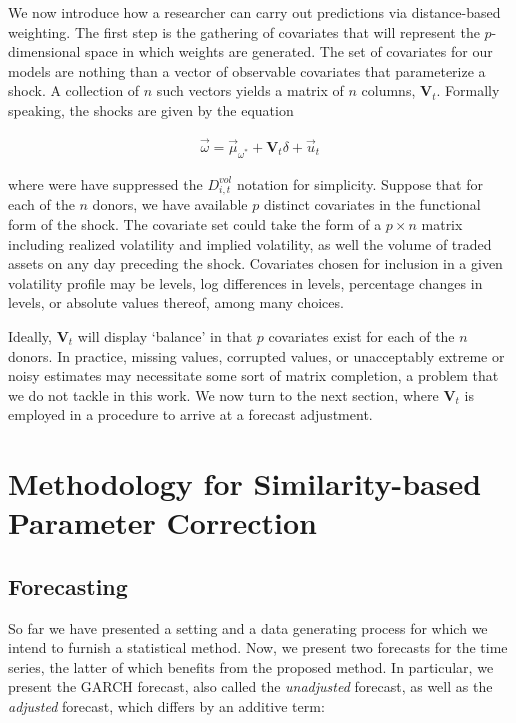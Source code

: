 \documentclass[11pt,3p,review,authoryear]{elsarticle}
\theoremstyle{definition}
\begin{document}
    We now introduce how a researcher can carry out predictions via distance-based weighting.  The first step is the gathering of covariates that will represent the $p$-dimensional space in which weights are generated.  The set of covariates for our models are nothing than a vector of observable covariates that parameterize a shock.  A collection of $n$ such vectors yields a matrix of $n$ columns, $\textbf{V}_{t}$.  Formally speaking, the shocks are given by the equation

    \begin{align*}
     \vec{\omega} = \vec{\mu}_{\omega^{*}} + \textbf{V}_{t}\delta + \vec{u}_{t}  
    \end{align*}
    
    where were have suppressed the $D^{vol}_{i,t}$ notation for simplicity.  Suppose that for each of the $n$ donors, we have available $p$ distinct covariates in the functional form of the shock.  The covariate set could take the form of a $p \times n$ matrix including realized volatility and implied volatility, as well the volume of traded assets on any day preceding the shock.  Covariates chosen for inclusion in a given volatility profile may be levels, log differences in levels, percentage changes in levels, or absolute values thereof, among many choices.

      Ideally, $\textbf{V}_{t}$ will display `balance' in that $p$ covariates exist for each of the $n$ donors.  In practice, missing values, corrupted values, or unacceptably extreme or noisy estimates may necessitate some sort of matrix completion, a problem that we do not tackle in this work.  We now turn to the next section, where $\textbf{V}_{t}$ is employed in a procedure to arrive at a forecast adjustment. 
    

\section{Methodology for Similarity-based Parameter Correction}

\subsection{Forecasting}

So far we have presented a setting and a data generating process for which we intend to furnish a statistical method.  Now, we present two forecasts for the time series, the latter of which benefits from the proposed method.  In particular, we present the GARCH forecast, also called the \textit{unadjusted} forecast, as well as the \textit{adjusted} forecast, which differs by an additive term:
\end{document}
